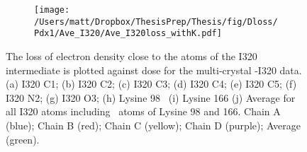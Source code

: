 \begin{figure}
\begin{subfigure}{.5\textwidth}
  \centering
  \texttt{[image: /Users/matt/Dropbox/ThesisPrep/Thesis/fig/Dloss/Pdx1/Ave\_I320/Ave\_I320loss\_withK.pdf]}
  \caption{}
  \label{fig:sfig10}
\end{subfigure}
\caption[Quantifying radiation damage around I320 Atoms]{The loss of electron density close to the atoms of the I320 intermediate is plotted against dose for the multi-crystal \atpdx -I320 data. (a) I320 C1; (b) I320 C2; (c) I320 C3; (d) I320 C4; (e) I320 C5; (f) I320 N2; (g) I320 O3; (h) Lysine 98 \nh ~(i) Lysine 166 \nh (j) Average for all I320 atoms including \nh ~atoms of Lysine 98 and 166. Chain A (blue); Chain B (red); Chain C (yellow); Chain D (purple); Average (green).  \label{fig:Dloss_I320}}
\end{figure}

